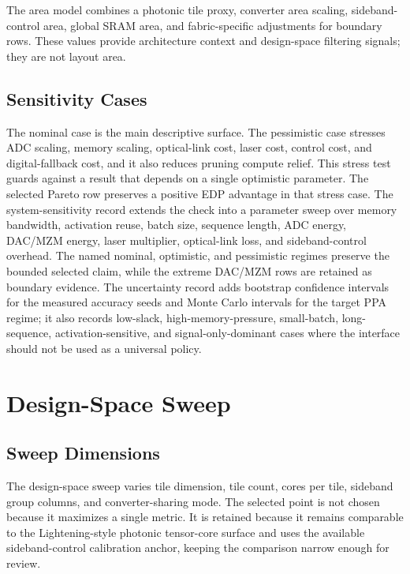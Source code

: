 \documentclass[10pt,journal]{IEEEtran}
\begin{document}
The area model combines a photonic tile proxy, converter area scaling,
sideband-control area, global SRAM area, and fabric-specific adjustments for
boundary rows. These values provide architecture context and design-space
filtering signals; they are not layout area.

\subsection{Sensitivity Cases}

The nominal case is the main descriptive surface. The pessimistic case stresses
ADC scaling, memory scaling, optical-link cost, laser cost, control cost, and
digital-fallback cost, and it also reduces pruning compute relief. This stress
test guards against a result that depends on a single optimistic parameter. The
selected Pareto row preserves a positive EDP advantage in that stress case.
The system-sensitivity record extends the check into a parameter sweep over
memory bandwidth, activation reuse, batch size, sequence length, ADC energy,
DAC/MZM energy, laser multiplier, optical-link loss, and sideband-control
overhead. The named nominal, optimistic, and pessimistic regimes preserve the
bounded selected claim, while the extreme DAC/MZM rows are retained as boundary
evidence. The uncertainty record adds bootstrap confidence intervals for the
measured accuracy seeds and Monte Carlo intervals for the target PPA regime; it
also records low-slack, high-memory-pressure,
small-batch, long-sequence, activation-sensitive, and signal-only-dominant
cases where the interface should not be used as a universal policy.

\section{Design-Space Sweep}

\subsection{Sweep Dimensions}

The design-space sweep varies tile dimension, tile count, cores per tile,
sideband group columns, and converter-sharing mode. The selected point is not
chosen because it maximizes a single metric. It is retained because it remains
comparable to the Lightening-style photonic tensor-core surface and uses the
available sideband-control calibration anchor, keeping the comparison narrow
enough for review.
\end{document}
